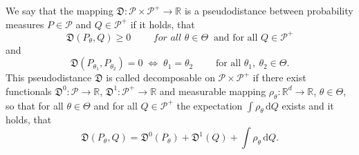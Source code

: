 		\begin{definition}
	We say that the mapping $\mathfrak{D}:\mathcal{P}\times\mathcal{P}^+ \rightarrow \mathbb{R}$ is a pseudodistance between probability measures $P \in \mathcal{P}$ and $Q \in \mathcal{P}^+$ if it holds, that	
		\begin{equation}
			\mathfrak{D}(P_\theta,Q) \geq 0 \qquad \textit{ for all } \theta \in \Theta \: \text{ and for all } Q \in \mathcal{P}^+
		\end{equation}
		and 		
		\begin{equation}
			\mathfrak{D}(P_{\theta_1},P_{\theta_2})=0 \; \Leftrightarrow \; \theta_1=\theta_2 \qquad \text{ for all } \theta_1,\: \theta_2 \in \Theta.
		\end{equation}	
	This pseudodistance $\mathfrak{D}$ is called decomposable on $\mathcal{P}\times\mathcal{P}^+$ if there exist functionals 
		 $\mathfrak{D}^0:\mathcal{P}\rightarrow\mathbb{R}$, $ \mathfrak{D}^1:\mathcal{P}^+ \rightarrow \mathbb{R}$ and measurable mapping
		  $\rho_\theta : \mathbb{R}^d \rightarrow \mathbb{R}$, $ \theta \in \Theta$, so that for all $\theta \in \Theta$ and for all $Q \in \mathcal{P}^+$ the expectation $\int{\rho_\theta }\, \mathrm{d}Q$ exists and it holds, that
		\begin{equation}
			\mathfrak{D} (P_\theta, Q) = \mathfrak{D}^0 (P_\theta) + \mathfrak{D}^1 (Q) + \int \rho_\theta \, \mathrm{d}Q.
		\end{equation}
\end{definition}

